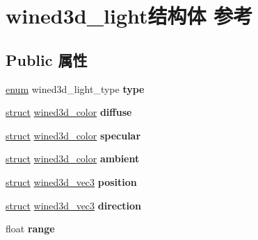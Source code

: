 \hypertarget{structwined3d__light}{}\section{wined3d\+\_\+light结构体 参考}
\label{structwined3d__light}
\subsection*{Public 属性}
\begin{DoxyCompactItemize}
\item 
\mbox{\label{structwined3d__light_aac57dc000d450e19b3a4f5586ce66f52}} 
\hyperlink{interfaceenum}{enum} wined3d\+\_\+light\+\_\+type {\bfseries type}
\item 
\mbox{\label{structwined3d__light_aa2690d9b41c2116371453a1b5e231f46}} 
\hyperlink{interfacestruct}{struct} \hyperlink{structwined3d__color}{wined3d\+\_\+color} {\bfseries diffuse}
\item 
\mbox{\label{structwined3d__light_a2396726e776a6a896c37186f11846a8f}} 
\hyperlink{interfacestruct}{struct} \hyperlink{structwined3d__color}{wined3d\+\_\+color} {\bfseries specular}
\item 
\mbox{\label{structwined3d__light_ae5496bf4cb29c9da251a03f1a5b7acf0}} 
\hyperlink{interfacestruct}{struct} \hyperlink{structwined3d__color}{wined3d\+\_\+color} {\bfseries ambient}
\item 
\mbox{\label{structwined3d__light_aa5fdef0e0ee4adc53f78756d3c83d5b2}} 
\hyperlink{interfacestruct}{struct} \hyperlink{structwined3d__vec3}{wined3d\+\_\+vec3} {\bfseries position}
\item 
\mbox{\label{structwined3d__light_af2d8903dbf1616fc451453b7a520ee7e}} 
\hyperlink{interfacestruct}{struct} \hyperlink{structwined3d__vec3}{wined3d\+\_\+vec3} {\bfseries direction}
\item 
\mbox{\label{structwined3d__light_a5184419dc36ec45c75280142b68ecbd4}} 
float {\bfseries range}
\item 
\mbox{\label{structwined3d__light_a0b274a057d6e30490eda7115400a5fbd}} 

\end{DoxyCompactItemize}
